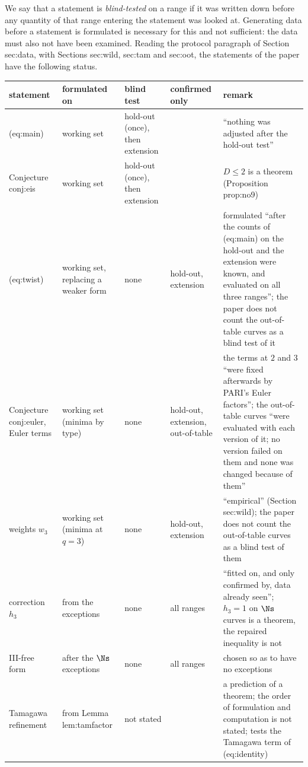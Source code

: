 \begin{sloppypar}
\begin{remark}\label{rem:computation:test-status}
We say that a statement is \emph{blind-tested} on a range if it was written down before any quantity of that range entering the statement was
looked at. Generating data before a statement is formulated is necessary for this and not sufficient: the data must also not have been
examined. Reading the protocol paragraph of Section sec:data, with Sections sec:wild, sec:tam and sec:oot, the statements of the paper have the
following status.
\begin{center}\footnotesize
\begin{tabular}{p{2.6cm}p{2.1cm}p{2.3cm}p{1.7cm}p{4.6cm}}
\toprule
statement & formulated on & blind test & confirmed only & remark\\
\midrule
(eq:main) & working set & hold-out (once), then extension & & ``nothing was adjusted after the hold-out test''\\
Conjecture conj:eis & working set & hold-out (once), then extension & & $D\le2$ is a theorem (Proposition prop:no9)\\
(eq:twist) & working set, replacing a weaker form & none & hold-out, extension & formulated ``after the counts of (eq:main) on the hold-out and the extension were known, and evaluated on all three ranges''; the paper does not count the out-of-table curves as a blind test of it\\
Conjecture conj:euler, Euler terms & working set (minima by type) & none & hold-out, extension, out-of-table & the terms at $2$ and $3$ ``were fixed afterwards by PARI's Euler factors''; the out-of-table curves ``were evaluated with each version of it; no version failed on them and none was changed because of them''\\
weights $w_3$ & working set (minima at $q=3$) & none & hold-out, extension & ``empirical'' (Section sec:wild); the paper does not count the out-of-table curves as a blind test of them\\
correction $h_3$ & from the exceptions & none & all ranges & ``fitted on, and only confirmed by, data already seen''; $h_3=1$ on $\Ns$ curves is a theorem, the repaired inequality is not\\
III-free form & after the $\Ns$ exceptions & none & all ranges & chosen so as to have no exceptions\\
Tamagawa refinement & from Lemma lem:tamfactor & not stated & & a prediction of a theorem; the order of formulation and computation is not stated; tests the Tamagawa term of (eq:identity)\\

\end{tabular}
\end{center}
\end{remark}
\end{sloppypar}
